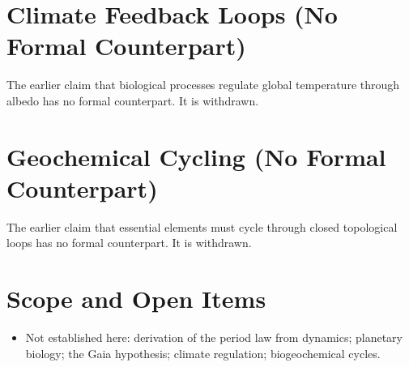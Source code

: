 \documentclass[11pt, a4paper]{article}
\begin{document}
\section{Climate Feedback Loops (No Formal Counterpart)}
The earlier claim that biological processes regulate global temperature through albedo has no formal counterpart. It is withdrawn.

\section{Geochemical Cycling (No Formal Counterpart)}
The earlier claim that essential elements must cycle through closed topological loops has no formal counterpart. It is withdrawn.

\section{Scope and Open Items}
\begin{itemize}
  \item Not established here: derivation of the period law from dynamics; planetary biology; the Gaia hypothesis; climate regulation; biogeochemical cycles.
\end{itemize}
\end{document}
